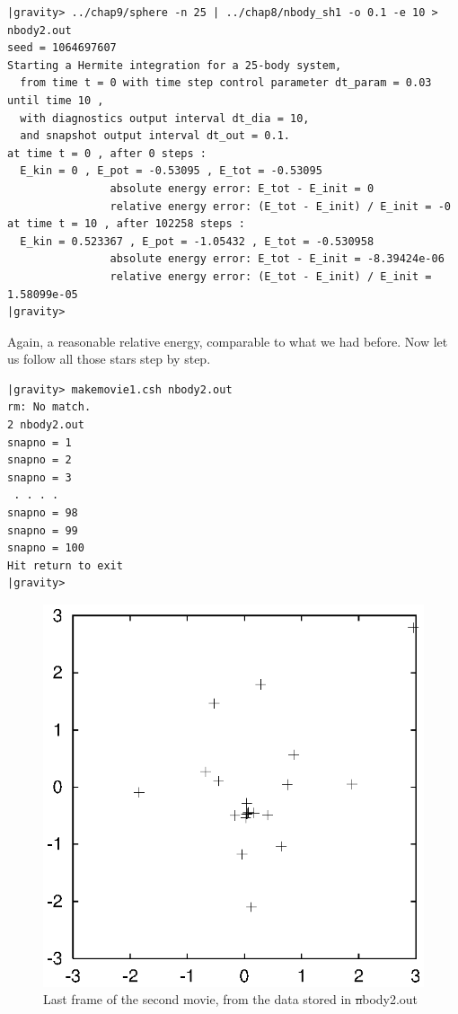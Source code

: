 \begin{small}
\begin{verbatim}
|gravity> ../chap9/sphere -n 25 | ../chap8/nbody_sh1 -o 0.1 -e 10 > nbody2.out
seed = 1064697607
Starting a Hermite integration for a 25-body system,
  from time t = 0 with time step control parameter dt_param = 0.03  until time 10 ,
  with diagnostics output interval dt_dia = 10,
  and snapshot output interval dt_out = 0.1.
at time t = 0 , after 0 steps :
  E_kin = 0 , E_pot = -0.53095 , E_tot = -0.53095
                absolute energy error: E_tot - E_init = 0
                relative energy error: (E_tot - E_init) / E_init = -0
at time t = 10 , after 102258 steps :
  E_kin = 0.523367 , E_pot = -1.05432 , E_tot = -0.530958
                absolute energy error: E_tot - E_init = -8.39424e-06
                relative energy error: (E_tot - E_init) / E_init = 1.58099e-05
|gravity>
\end{verbatim}
\end{small}

\abc

\carol
Again, a reasonable relative energy, comparable to what we had before.
Now let us follow all those stars step by step.

\cba

\begin{small}
\begin{verbatim}
|gravity> makemovie1.csh nbody2.out
rm: No match.
2 nbody2.out
snapno = 1
snapno = 2
snapno = 3
 . . . .
snapno = 98
snapno = 99
snapno = 100
Hit return to exit
|gravity>
\end{verbatim}
\end{small}

\begin{figure}[htb]
\centering
\includegraphics[width=4.5in]{chap10/movie2.ps}
\caption[last frame of movie \#2]
{Last frame of the second movie, from the data stored in {\st nbody2.out}}
\label{fig:movie2}
\end{figure}

